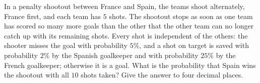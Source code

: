 In a penalty shootout between France and Spain, the teams shoot alternately, France first, and each team has $5$ shots. The shootout stops as soon as one team has scored so many more goals than the other that the other team can no longer catch up with its remaining shots. Every shot is independent of the others: the shooter misses the goal with probability $5\%$, and a shot on target is saved with probability $2\%$ by the Spanish goalkeeper and with probability $25\%$ by the French goalkeeper; otherwise it is a goal. What is the probability that Spain wins the shootout with all $10$ shots taken? Give the answer to four decimal places.

